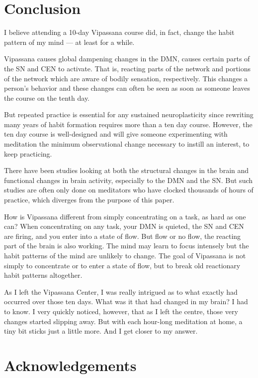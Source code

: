 \documentclass[a4paper, amsfonts, amssymb, amsmath, reprint, showkeys, nofootinbib, twoside]{revtex4-1}
\begin{document}
\section{Conclusion}

I believe attending a 10-day Vipassana course did, in fact, change the habit pattern
of my mind --- at least for a while.

Vipassana causes global dampening changes in the DMN, causes certain parts of
the SN and CEN to activate. That is, reacting parts of the network and
portions of the network which are aware of bodily sensation, respectively.
This changes a person's behavior and these changes can often be seen as soon as
someone leaves the course on the tenth day.

But repeated practice is essential for any sustained neuroplasticity since rewriting
many years of habit formation requires more than a ten day course. However, the ten
day course is well-designed  and will give someone experimenting with meditation the
minimum observational change necessary to instill an interest, to keep practicing.

There have been studies looking at both the structural changes in the brain and
functional changes in brain activity, especially to the DMN and the SN. But such
studies are often only done on meditators who have clocked thousands of hours of
practice, which diverges from the purpose of this paper. \cite{tibetanmonks,
  experiencemed, experiencemeda}

How is Vipassana different from simply concentrating on a task, as hard as one can?
When concentrating on any task, your DMN is quieted, the SN and CEN are firing, and you
enter into a state of flow. But flow or no flow, the reacting part of the brain is
also working. The mind may learn to focus intensely but the habit patterns of the
mind are unlikely to change. The goal of Vipassana is not simply to concentrate or to
enter a state of flow, but to break old reactionary habit patterns altogether.

As I left the Vipassana Center, I was really intrigued as to what exactly had
occurred over those ten days. What was it that had changed in my brain? I had to
know. I very quickly noticed, however, that as I left the centre, those very changes
started slipping away. But with each hour-long meditation at home, a tiny bit sticks
just a little more. And I get closer to my answer.

\section{Acknowledgements}
\end{document}
